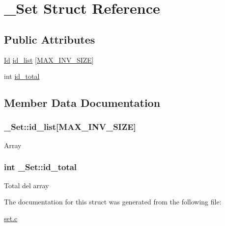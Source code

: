 \hypertarget{struct__Set}{}\section{\+\_\+\+Set Struct Reference}
\label{struct__Set}
\subsection*{Public Attributes}
\begin{DoxyCompactItemize}
\item 
\hyperlink{types_8h_a845e604fb28f7e3d97549da3448149d3}{Id} \hyperlink{struct__Set_adde563bd36bf2d00bd5a49b493c4f3bb}{id\+\_\+list} \mbox{[}\hyperlink{set_8h_af6e65f998f2940aaf745740214a3facf}{M\+A\+X\+\_\+\+I\+N\+V\+\_\+\+S\+I\+ZE}\mbox{]}
\item 
int \hyperlink{struct__Set_afe941cf156f1000d962bff58835ba853}{id\+\_\+total}
\end{DoxyCompactItemize}


\subsection{Member Data Documentation}
\subsubsection[{\texorpdfstring{id\+\_\+list}{id_list}}]{ \+\_\+\+Set\+::id\+\_\+list\mbox{[}{\bf M\+A\+X\+\_\+\+I\+N\+V\+\_\+\+S\+I\+ZE}\mbox{]}}\hypertarget{struct__Set_adde563bd36bf2d00bd5a49b493c4f3bb}{}\label{struct__Set_adde563bd36bf2d00bd5a49b493c4f3bb}
Array 
\subsubsection[{\texorpdfstring{id\+\_\+total}{id_total}}]{\setlength{\rightskip}{0pt plus 5cm}int \+\_\+\+Set\+::id\+\_\+total}\hypertarget{struct__Set_afe941cf156f1000d962bff58835ba853}{}\label{struct__Set_afe941cf156f1000d962bff58835ba853}
Total del array 

The documentation for this struct was generated from the following file\+:\begin{DoxyCompactItemize}
\item 
\hyperlink{set_8c}{set.\+c}\end{DoxyCompactItemize}
